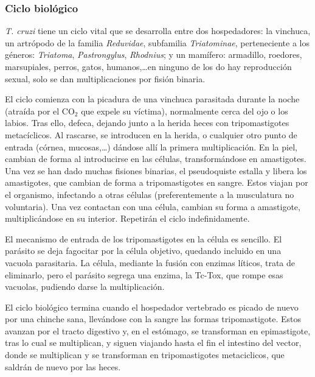 \subsubsection{Ciclo biológico}
\textit{T. cruzi} tiene un ciclo vital que se desarrolla entre dos hospedadores: la vinchuca, un artrópodo de la familia \textit{Reduvidae}, subfamilia \textit{Triatominae}, perteneciente a los géneros: \textit{Triatoma}, \textit{Pastrongylus}, \textit{Rhodnius}; y un mamífero: armadillo, roedores, marsupiales, perros, gatos, humanos,\dots en ninguno de los do hay reproducción sexual, solo se dan multiplicaciones por fisión binaria.

El ciclo comienza con la picadura de una vinchuca parasitada durante la noche (atraída por el CO$_2$ que expele su víctima), normalmente cerca del ojo o los labios. Tras ello, defeca, dejando junto a la herida heces con tripomastigotes metacíclicos. Al rascarse, se introducen en la herida, o cualquier otro punto de entrada (córnea, mucosas,\dots) dándose allí la primera multiplicación. En la piel, cambian de forma al introducirse en las células, transformándose en amastigotes. Una vez se han dado muchas fisiones binarias, el pseudoquiste estalla y libera los amastigotes, que cambian de forma a tripomastigotes en sangre. Estos viajan por el organismo, infectando a otras células (preferentemente a la musculatura no voluntaria). Una vez contactan con una célula, cambian su forma a amastigote, multiplicándose en su interior. Repetirán el ciclo indefinidamente.

El mecanismo de entrada de los tripomastigotes en la célula es sencillo. El parásito se deja fagocitar por la célula objetivo, quedando incluido en una vacuola parasitaria. La célula, mediante la fusión con enzimas líticos, trata de eliminarlo, pero el parásito segrega una enzima, la Tc-Tox, que rompe esas vacuolas, pudiendo darse la multiplicación.

El ciclo biológico termina cuando el hospedador vertebrado es picado de nuevo por una chinche sana, llevándose con la sangre las formas tripomastigote. Estos avanzan por el tracto digestivo y, en el estómago, se transforman en epimastigote, tras lo cual se multiplican, y siguen viajando hasta el fin el intestino del vector, donde se multiplican y se transforman en tripomastigotes metaciclicos, que saldrán de nuevo por las heces.

